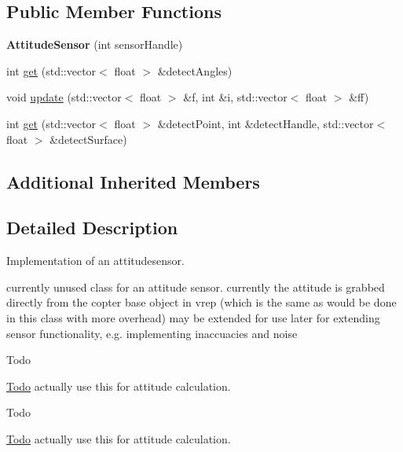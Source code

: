 \subsection*{Public Member Functions}
\begin{DoxyCompactItemize}
\item 
{\bfseries Attitude\+Sensor} (int sensor\+Handle)\hypertarget{classAttitudeSensor_ada1382f003b390e357e9617e00299ddd}{}\label{classAttitudeSensor_ada1382f003b390e357e9617e00299ddd}

\item 
int \hyperlink{classAttitudeSensor_a354f56cfccea6f60b4822b9e2603afc8}{get} (std\+::vector$<$ float $>$ \&detect\+Angles)
\item 
void \hyperlink{classAttitudeSensor_a035c43c2ae16df0dedbbc7ae4cb575d9}{update} (std\+::vector$<$ float $>$ \&f, int \&i, std\+::vector$<$ float $>$ \&ff)
\item 
int \hyperlink{classAttitudeSensor_a29d069767d7b3b36a998ae70764134dd}{get} (std\+::vector$<$ float $>$ \&detect\+Point, int \&detect\+Handle, std\+::vector$<$ float $>$ \&detect\+Surface)
\end{DoxyCompactItemize}
\subsection*{Additional Inherited Members}


\subsection{Detailed Description}
Implementation of an attitudesensor. 

currently unused class for an attitude sensor. currently the attitude is grabbed directly from the copter base object in vrep (which is the same as would be done in this class with more overhead) may be extended for use later for extending sensor functionality, e.\+g. implementing inaccuacies and noise

\begin{DoxyRefDesc}{Todo}
\item[\hyperlink{todo__todo000001}{Todo}]actually use this for attitude calculation. \end{DoxyRefDesc}


\begin{DoxyRefDesc}{Todo}
\item[\hyperlink{todo__todo000002}{Todo}]actually use this for attitude calculation. \end{DoxyRefDesc}


